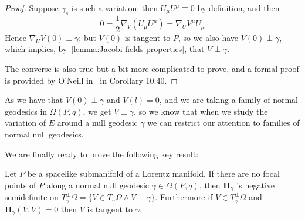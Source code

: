 \begin{proof}
	Suppose \(\gamma_s\) is such a variation: then \(U_{\mu}U^{\mu}\equiv 0\) by definition, and then
	\[
	0 = \frac{1}{2}\nabla_V(U_{\mu}U^{\mu}) = \nabla_UV^{\mu}U_{\mu}
	\]
	Hence \(\nabla_UV(0) \perp \gamma\); but \(V(0)\) is tangent to \(P\), so we also have \(V(0) \perp \gamma\), which implies, by~\ref{lemma:Jacobi-fields-properties}, that \(V \perp \gamma\).
	
	The converse is also true but a bit more complicated to prove, and a formal proof is provided by O'Neill in~\cite{o1983semi} in Corollary 10.40.
\end{proof}

As we have that \(V(0) \perp \gamma\) and \(V(l) = 0\), and we are taking a family of normal geodesics in \(\Omega(P, q)\), we get \(V \perp \gamma\), so we know that when we study the variation of \(E\) around a null geodesic \(\gamma\) we can restrict our attention to families of normal null geodesics.

We are finally ready to prove the following key result:
\begin{prop}
	\label{prop:H-positivity-criteria}
	Let \(P\) be a spacelike submanifold of a Lorentz manifold. If there are no focal points of \(P\) along a normal null geodesic \(\gamma\in\Omega(P,q)\), then \(\textbf{H}_\gamma\) is negative semidefinite on 
	\(T_{\gamma}^{\perp}\Omega = \{V \in T_{\gamma}\Omega \wedge V \perp \gamma\}\). Furthermore if \(V \in T_{\gamma}^{\perp}\Omega \) and \(\textbf{H}_\gamma(V, V) = 0\) then \(V\) is tangent to \(\gamma\).
\end{prop}

